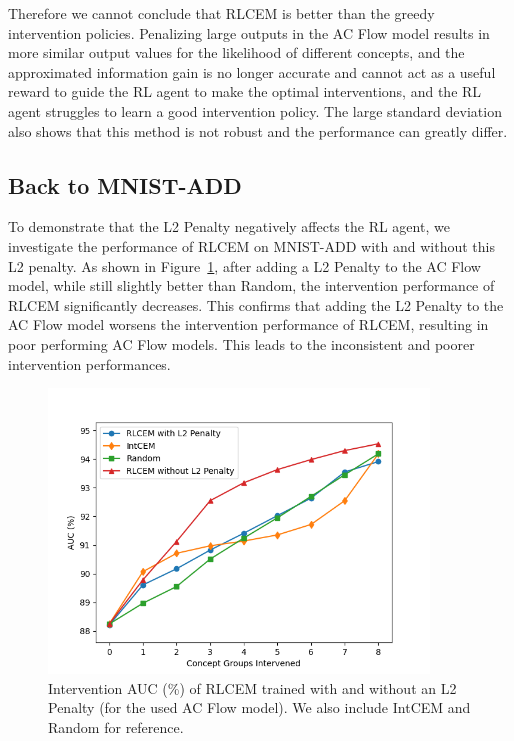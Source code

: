 Therefore we cannot conclude that RLCEM is better than the greedy
intervention policies. Penalizing large outputs 
in the AC Flow model results in more similar output values for the likelihood
of different concepts, and the approximated information gain is no longer
accurate and cannot act as a useful reward to guide the RL agent to make 
the optimal interventions, and the RL agent struggles to learn a good intervention policy.
The large standard deviation also shows that this method is not robust
and the performance can greatly differ.

\subsection{Back to MNIST-ADD}
To demonstrate that the L2 Penalty negatively affects
the RL agent, we investigate the performance of RLCEM on MNIST-ADD with and without
this L2 penalty.
As shown in Figure~\ref{fig:mnist-rlcem-performance-l2},
after adding a L2 Penalty to the AC Flow model,
while still slightly better than Random, the intervention performance of RLCEM significantly decreases.
This confirms that adding the L2 Penalty
to the AC Flow model worsens the intervention performance of 
RLCEM, resulting in poor performing 
AC Flow models.
This leads to the inconsistent and poorer
intervention performances.

\begin{figure}[!h]
    \centering
    \includegraphics[width=0.9\textwidth]{figs/evaluation/mnist_rlcem_performance_l2.png}
    \caption{
        Intervention AUC (\%) of RLCEM trained with and without an L2 Penalty (for the used AC Flow model).
        We also include IntCEM and Random for reference.
    }
    \label{fig:mnist-rlcem-performance-l2}
\end{figure}



